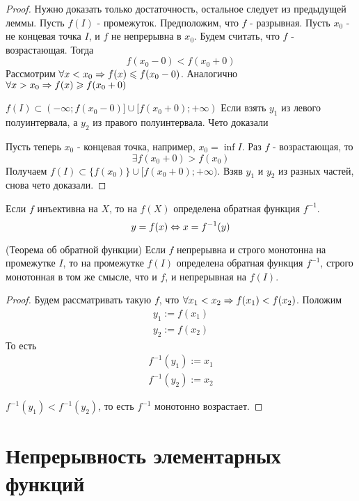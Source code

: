 \begin{proof}
	Нужно доказать только достаточность, остальное следует из предыдущей леммы. Пусть $f(I)$ - промежуток. Предположим, что $f$ - разрывная. Пусть $x_0$ - не концевая точка $I$, и $f$ не непрерывна в $x_0$. Будем считать, что $f$ - возрастающая. Тогда
	$$
		f(x_0 - 0) < f(x_0 + 0)
	$$
	Рассмотрим $\forall x < x_0 \Rightarrow f(x) \leqslant f(x_0 - 0)$. Аналогично $\forall x > x_0 \Rightarrow f(x) \geqslant f(x_0 + 0)$
	
	$f(I) \subset (-\infty; f(x_0 - 0)] \cup [f(x_0 + 0); +\infty)$
	Если взять $y_1$ из левого полуинтервала, а $y_2$ из правого полуинтервала. Чето доказали
	
	Пусть теперь $x_0$ - концевая точка, например, $x_0 = \inf I$. Раз $f$ - возрастающая, то
	$$
		\exists f(x_0 + 0) > f(x_0)
	$$
	Получаем $f(I) \subset \{f(x_0)\} \cup [f(x_0 + 0); +\infty)$. Взяв $y_1$ и $y_2$ из разных частей, снова чето доказали.
\end{proof}

\begin{definition}
	Если $f$ инъективна на $X$, то на $f(X)$ определена обратная функция $f^{-1}$.
	$$
		y = f(x) \Leftrightarrow x = f^{-1}(y)
	$$
\end{definition}

\begin{theorem} (Теорема об обратной функции)
	Если $f$ непрерывна и строго монотонна на промежутке $I$, то на промежутке $f(I)$ определена обратная функция $f^{-1}$, строго монотонная в том же смысле, что и $f$, и непрерывная на $f(I)$.
\end{theorem}

\begin{proof}
	Будем рассматривать такую $f$, что $\forall x_1 < x_2 \Rightarrow f(x_1) < f(x_2)$. Положим
	\begin{align*}
		y_1 := f(x_1)
		\\
		y_2 := f(x_2)
	\end{align*}
	То есть
	\begin{align*}
		f^{-1}(y_1) := x_1
		\\
		f^{-1}(y_2) := x_2
	\end{align*}
	
	$f^{-1}(y_1) < f^{-1}(y_2)$, то есть $f^{-1}$ монотонно возрастает.
	
\end{proof}

\section{Непрерывность элементарных функций}

